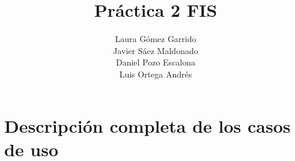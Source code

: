 \documentclass[10pt,a4paper,spanish]{report}
\title{\textbf{Práctica 2 FIS}}
\author{Laura Gómez Garrido\\
		Javier Sáez Maldonado\\
		Daniel Pozo Escalona\\
		Luis Ortega Andrés}
\begin{document}
\maketitle

\section{Descripción completa de los casos de uso}























































\end{document}
